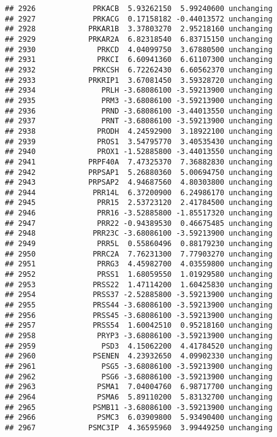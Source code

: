 \documentclass[]{article}
\begin{document}
\begin{verbatim}
## 2926             PRKACB  5.93262150  5.99240600 unchanging
## 2927             PRKACG  0.17158182 -0.44013572 unchanging
## 2928            PRKAR1B  3.37803270  2.95218160 unchanging
## 2929            PRKAR2A  6.82318540  6.83715150 unchanging
## 2930              PRKCD  4.04099750  3.67880500 unchanging
## 2931              PRKCI  6.60941360  6.61107300 unchanging
## 2932             PRKCSH  6.72262430  6.60562370 unchanging
## 2933            PRKRIP1  3.67081450  3.59328720 unchanging
## 2934               PRLH -3.68086100 -3.59213900 unchanging
## 2935               PRM3 -3.68086100 -3.59213900 unchanging
## 2936               PRND -3.68086100 -3.44013550 unchanging
## 2937               PRNT -3.68086100 -3.59213900 unchanging
## 2938              PRODH  4.24592900  3.18922100 unchanging
## 2939              PROS1  3.54795770  3.40535430 unchanging
## 2940              PROX1 -1.52885800 -3.44013550 unchanging
## 2941            PRPF40A  7.47325370  7.36882830 unchanging
## 2942            PRPSAP1  5.26880360  5.00694750 unchanging
## 2943            PRPSAP2  4.94687560  4.80303800 unchanging
## 2944             PRR14L  6.37200900  6.24986170 unchanging
## 2945              PRR15  2.53723120  2.41784500 unchanging
## 2946              PRR16 -3.52885800 -1.85517320 unchanging
## 2947              PRR22 -0.94389530  0.46675485 unchanging
## 2948             PRR23C -3.68086100 -3.59213900 unchanging
## 2949              PRR5L  0.55860496  0.88179230 unchanging
## 2950             PRRC2A  7.76231300  7.77903270 unchanging
## 2951              PRRG3  4.45982700  4.03559800 unchanging
## 2952              PRSS1  1.68059550  1.01929580 unchanging
## 2953             PRSS22  1.47114200  1.60425830 unchanging
## 2954             PRSS37 -2.52885800 -3.59213900 unchanging
## 2955             PRSS44 -3.68086100 -3.59213900 unchanging
## 2956             PRSS45 -3.68086100 -3.59213900 unchanging
## 2957             PRSS54  1.60042510  0.95218160 unchanging
## 2958              PRYP3 -3.68086100 -3.59213900 unchanging
## 2959               PSD3  4.15062200  4.41784520 unchanging
## 2960             PSENEN  4.23932650  4.09902330 unchanging
## 2961               PSG5 -3.68086100 -3.59213900 unchanging
## 2962               PSG6 -3.68086100 -3.59213900 unchanging
## 2963              PSMA1  7.04004760  6.98717700 unchanging
## 2964              PSMA6  5.89110200  5.83132700 unchanging
## 2965             PSMB11 -3.68086100 -3.59213900 unchanging
## 2966              PSMC3  6.03909800  5.93490400 unchanging
## 2967            PSMC3IP  4.36595960  3.99449250 unchanging

\end{verbatim}
\end{document}

